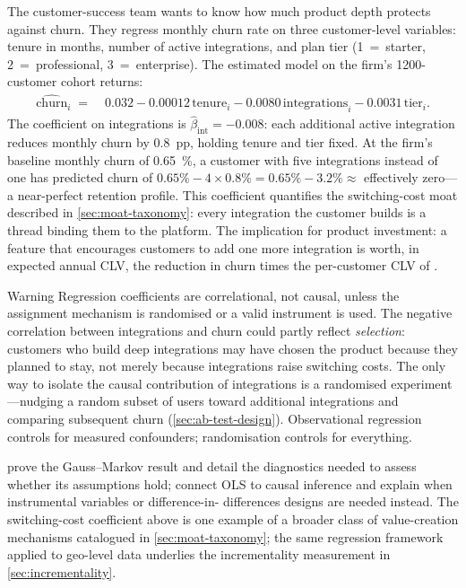 \begin{example}
The customer-success team wants to know how much product depth protects against churn. They
regress monthly churn rate on three customer-level variables: tenure in months, number of
active integrations, and plan tier (1~=~starter, 2~=~professional, 3~=~enterprise). The
estimated model on the firm's \num{1200}-customer cohort returns:
\begin{align*}
  \widehat{\text{churn}}_i \;=\;{}
    & 0.032
      - 0.00012\,\text{tenure}_i
      - 0.0080\,\text{integrations}_i
      - 0.0031\,\text{tier}_i.
\end{align*}
The coefficient on integrations is \(\hat{\beta}_{\text{int}} = -0.008\): each additional
active integration reduces monthly churn by \qty{0.8}{pp}, holding tenure and tier fixed.
At the firm's baseline monthly churn of \qty{0.65}{\percent}, a customer with five
integrations instead of one has predicted churn of
\(0.65\% - 4\times0.8\% = 0.65\% - 3.2\% \approx \) effectively zero---a near-perfect
retention profile. This coefficient quantifies the switching-cost moat described in
\cref{sec:moat-taxonomy}: every integration the customer builds is a thread binding them
to the platform. The implication for product investment: a feature that encourages customers
to add one more integration is worth, in expected annual CLV, the reduction in churn times
the per-customer CLV of .
\end{example}

\begin{admonition}{Warning}
Regression coefficients are correlational, not causal, unless the assignment mechanism is
randomised or a valid instrument is used. The negative correlation between integrations and
churn could partly reflect \emph{selection}: customers who build deep integrations may have
chosen the product because they planned to stay, not merely because integrations raise
switching costs. The only way to isolate the causal contribution of integrations is a
randomised experiment---nudging a random subset of users toward additional integrations and
comparing subsequent churn (\cref{sec:ab-test-design}). Observational regression controls
for measured confounders; randomisation controls for everything.
\end{admonition}

\textcite{wooldridge2020introductory} prove the Gauss--Markov result and detail the
diagnostics needed to assess whether its assumptions hold; \textcite{angrist2009mostly}
connect OLS to causal inference and explain when instrumental variables or difference-in-
differences designs are needed instead. The switching-cost coefficient above is one example
of a broader class of value-creation mechanisms catalogued in \cref{sec:moat-taxonomy};
the same regression framework applied to geo-level data underlies the incrementality
measurement in \cref{sec:incrementality}.


